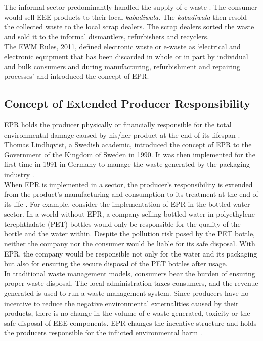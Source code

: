 \documentclass[a4paper, 12pt]{article}
\begin{document}
                    The informal sector predominantly handled the supply of e-waste \parencite{thakurnews}. The consumer would sell EEE products to their local \textit{kabadiwala}. The \textit{kabadiwala} then resold the collected waste to the local scrap dealers. The scrap dealers sorted the waste and sold it to the informal dismantlers, refurbishers and recyclers. \\
                    
                    The EWM Rules, 2011, defined electronic waste or e-waste as ‘electrical and electronic equipment that has been discarded in whole or in part by individual and bulk consumers and during manufacturing, refurbishment and repairing processes’ and introduced the concept of EPR. 
                    
                    \subsection{Concept of Extended Producer Responsibility}
                    
                    EPR holds the producer physically or financially responsible for the total environmental damage caused by his/her product at the end of its lifespan \parencite{wallschapter}. Thomas Lindhqvist, a Swedish academic, introduced the concept of EPR to the Government of the Kingdom of Sweden in 1990. It was then implemented for the first time in 1991 in Germany to manage the waste generated by the packaging industry \parencite{toxicspaper}. \\
                    
                    When EPR is implemented in a sector, the producer’s responsibility is extended from the product’s manufacturing and consumption to its treatment at the end of its life \parencite{toxicspaper}. For example, consider the implementation of EPR in the bottled water sector. In a world without EPR, a company selling bottled water in polyethylene terephthalate (PET) bottles would only be responsible for the quality of the bottle and the water within. Despite the pollution risk posed by the PET bottle, neither the company nor the consumer would be liable for its safe disposal. With EPR, the company would be responsible not only for the water and its packaging but also for ensuring the secure disposal of the PET bottles after usage. \\
                    
                    In traditional waste management models, consumers bear the burden of ensuring proper waste disposal. The local administration taxes consumers, and the revenue generated is used to run a waste management system. Since producers have no incentive to reduce the negative environmental externalities caused by their products, there is no change in the volume of e-waste generated, toxicity or the safe disposal of EEE components. EPR changes the incentive structure and holds the producers responsible for the inflicted environmental harm \parencite{bhaskarturagapaperb}. 
                    
\end{document}

